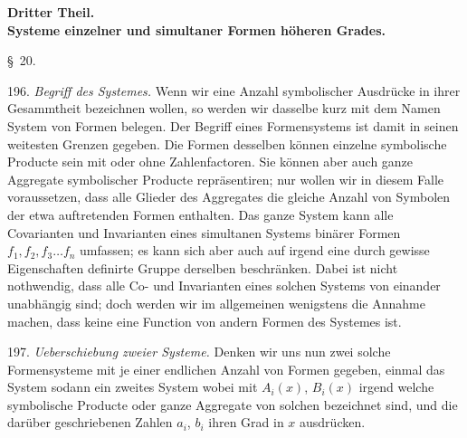 
\begin{center}
\textbf{Dritter Theil.}\\[4pt]
\textbf{Systeme einzelner und simultaner Formen h\"oheren Grades.}
\end{center}

\begin{center}
\S~20.\\
\end{center}

196. \textit{Begriff des Systemes.} Wenn wir eine Anzahl symbolischer Ausdr\"ucke in ihrer Gesammtheit bezeichnen wollen, so werden wir dasselbe kurz mit dem Namen \glqq System von Formen\grqq{} belegen. Der Begriff eines Formensystems ist damit in seinen weitesten Grenzen gegeben. Die Formen desselben k\"onnen einzelne symbolische Producte sein mit oder ohne Zahlenfactoren. Sie k\"onnen aber auch ganze Aggregate symbolischer Producte repr\"asentiren; nur wollen wir in diesem Falle voraussetzen, dass alle Glieder des Aggregates die gleiche Anzahl von Symbolen der etwa auftretenden Formen enthalten. Das ganze System kann alle Covarianten und Invarianten eines simultanen Systems bin\"arer Formen $f_1, f_2, f_3 \ldots f_n$ umfassen; es kann sich aber auch auf irgend eine durch gewisse Eigenschaften definirte Gruppe derselben beschr\"anken. Dabei ist nicht nothwendig, dass alle Co- und Invarianten eines solchen Systems von einander unabh\"angig sind; doch werden wir im allgemeinen wenigstens die Annahme machen, dass keine eine  Function von andern Formen des Systemes ist.

197. \textit{Ueberschiebung zweier Systeme.} Denken wir uns nun zwei solche Formensysteme mit je einer endlichen Anzahl von Formen gegeben, einmal das System
sodann ein zweites System
wobei mit $A_i(x)$, $B_i(x)$ irgend welche symbolische Producte oder ganze Aggregate von solchen bezeichnet sind, und die dar\"uber geschriebenen Zahlen $a_i$, $b_i$ ihren Grad in $x$ ausdr\"ucken.


